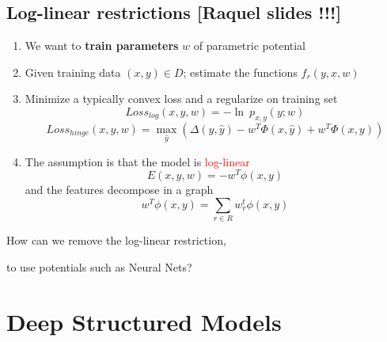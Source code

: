 \documentclass{beamer}
\begin{document}
\subsection*{Log-linear restrictions [Raquel slides !!!]}
	\begin{frame}
		\begin{enumerate}
			\item We want to \textbf{train parameters} $w$ of parametric potential 
			\item Given training data $(x, y) \in D$; estimate the functions $f_r(y,x,w)$
			\item Minimize a typically convex loss and a regularize on training set
				$$Loss_{log}(x, y, w) = - \ln~p_{x, y}(y; w)$$
				$$Loss_{hinge}(x, y, w) = \max_{\hat{y}} (\Delta(y, \hat{y}) - w^T\Phi(x, \hat{y}) + w^T\Phi(x, y))$$
			\item The assumption is that the model is \textcolor{red}{log-linear}
				$$E(x,y,w) = - w^T \phi(x,y)$$
			and the features decompose in a graph
				$$w^T\phi (x, y) = \sum_{r \in R} w_r^t\phi( x , y )$$
		\end{enumerate}
			\begin{tcolorbox}[colback=gray!2, colframe=red!90, title=Problem]
				\centering How can we remove the log-linear restriction, 
				
				to use potentials such as Neural Nets? 
			\end{tcolorbox}
	\end{frame}

\section{Deep Structured Models}
\frame{\tableofcontents[currentsection]}
\end{document}
